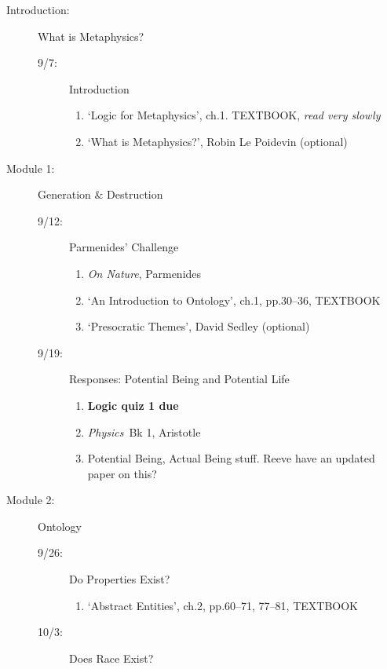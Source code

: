 \documentclass[article,oneside]{memoir}
\begin{document}
\begin{description}
\item[Introduction:]  What  is Metaphysics? 
\begin{description}
\item [9/7:] Introduction
\begin{enumerate}
\item `Logic for Metaphysics', ch.1. TEXTBOOK, \emph{read very slowly}
\item `What is Metaphysics?', Robin Le Poidevin (optional)
\end{enumerate}
\end{description}

\item[Module 1:] Generation \& Destruction
\begin{description}
\item [9/12:] Parmenides' Challenge
\begin{enumerate}
\item \emph{On Nature}, Parmenides
\item `An Introduction to Ontology', ch.1, pp.30--36, TEXTBOOK
\item `Presocratic Themes', David Sedley (optional)
\end{enumerate}

\item [9/19:] Responses: Potential Being and Potential Life 
\begin{enumerate}
\item \textbf{Logic quiz 1 due}
\item \emph{Physics}\ Bk 1, Aristotle
\item Potential Being, Actual Being stuff. Reeve have an updated paper on this?

 
\end{enumerate}
\end{description}

\item[Module 2:] Ontology
\begin{description}

\item [9/26:] Do Properties Exist? 

\begin{enumerate}
\item `Abstract Entities', ch.2, pp.60--71, 77--81, TEXTBOOK
\end{enumerate}

\item[10/3: ] Does Race Exist? 


\end{description}
\end{description}
\end{document}
